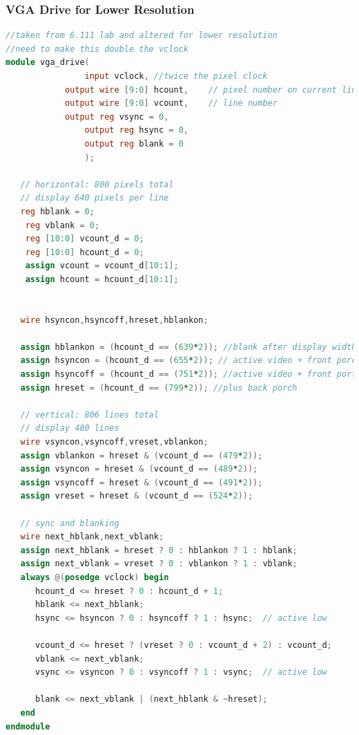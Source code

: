 \documentclass{article}
\begin{document}
\subsubsection{VGA Drive for Lower Resolution}
\begin{lstlisting}[language=Verilog]
//taken from 6.111 lab and altered for lower resolution
//need to make this double the vclock
module vga_drive(
				input vclock, //twice the pixel clock
            output wire [9:0] hcount,    // pixel number on current line
            output wire [9:0] vcount,	 // line number
            output reg vsync = 0,
				output reg hsync = 0,
				output reg blank = 0
				);

   // horizontal: 800 pixels total
   // display 640 pixels per line
   reg hblank = 0;
	reg vblank = 0;
	reg [10:0] vcount_d = 0;
	reg [10:0] hcount_d = 0;
	assign vcount = vcount_d[10:1];
	assign hcount = hcount_d[10:1];
	
	
   wire hsyncon,hsyncoff,hreset,hblankon;
	
   assign hblankon = (hcount_d == (639*2)); //blank after display width    
   assign hsyncon = (hcount_d == (655*2)); // active video + front porch
   assign hsyncoff = (hcount_d == (751*2)); //active video + front portch + sync
   assign hreset = (hcount_d == (799*2)); //plus back porch

   // vertical: 806 lines total
   // display 480 lines
   wire vsyncon,vsyncoff,vreset,vblankon;
   assign vblankon = hreset & (vcount_d == (479*2));    
   assign vsyncon = hreset & (vcount_d == (489*2));
   assign vsyncoff = hreset & (vcount_d == (491*2));
   assign vreset = hreset & (vcount_d == (524*2));

   // sync and blanking
   wire next_hblank,next_vblank;
   assign next_hblank = hreset ? 0 : hblankon ? 1 : hblank;
   assign next_vblank = vreset ? 0 : vblankon ? 1 : vblank;
   always @(posedge vclock) begin
      hcount_d <= hreset ? 0 : hcount_d + 1;
      hblank <= next_hblank;
      hsync <= hsyncon ? 0 : hsyncoff ? 1 : hsync;  // active low

      vcount_d <= hreset ? (vreset ? 0 : vcount_d + 2) : vcount_d;
      vblank <= next_vblank;
      vsync <= vsyncon ? 0 : vsyncoff ? 1 : vsync;  // active low

      blank <= next_vblank | (next_hblank & ~hreset);
   end
endmodule
\end{lstlisting}
\end{document}
